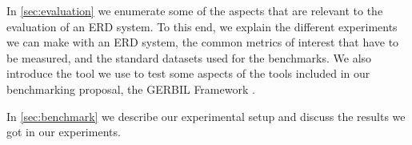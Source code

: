 In \autoref{sec:evaluation} we enumerate some of the aspects that are relevant to the evaluation of an ERD system. To this end, we explain the different experiments we can make with an ERD system, the common metrics of interest that have to be measured, and the standard datasets used for the benchmarks. We also introduce the tool we use to test some aspects of the tools included in our benchmarking proposal, the GERBIL Framework \cite{gerbil2015}.

In \autoref{sec:benchmark} we describe our experimental setup and discuss the results we got in our experiments.







